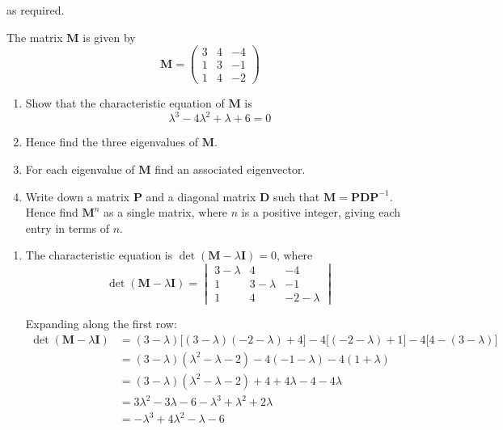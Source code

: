 \documentclass[leqno]{article}
\begin{document}
\begin{enumerate}[
  label=\textbf{\arabic*.},
  leftmargin=*,
  topsep=0pt,
  partopsep=0pt,
  parsep=0pt
]
\begin{djsSolution}
\begin{enumerate}[label=\textbf{(\alph*)}, start=1]
as required.
\end{enumerate}
\end{djsSolution}

\newpage

\questionitem

The matrix $\mathbf{M}$ is given by
\[\mathbf{M} = \begin{pmatrix} 3 & 4 & -4 \\ 1 & 3 & -1 \\ 1 & 4 & -2 \end{pmatrix}\]
\begin{enumerate}[label=\textbf{(\alph*)}]
  \item Show that the characteristic equation of $\mathbf{M}$ is
  \[\lambda^3 - 4\lambda^2 + \lambda + 6 = 0\] 
  \item Hence find the three eigenvalues of $\mathbf{M}$.  \\
  \item For each eigenvalue of $\mathbf{M}$ find an associated eigenvector.  \\
  \item Write down a matrix $\mathbf{P}$ and a diagonal matrix $\mathbf{D}$ such that $\mathbf{M} = \mathbf{P}\mathbf{D}\mathbf{P}^{-1}$. Hence find $\mathbf{M}^n$ as a single matrix, where $n$ is a positive integer, giving each entry in terms of $n$.  \\
\end{enumerate}

\vspace*{10pt}

\begin{djsSolution}
\begin{enumerate}[label=\textbf{(\alph*)}, start=1]
  \item The characteristic equation is \(\det(\mathbf{M}-\lambda\mathbf{I})=0\), where
\[
\det(\mathbf{M}-\lambda\mathbf{I})=\begin{vmatrix} 3-\lambda & 4 & -4 \\ 1 & 3-\lambda & -1 \\ 1 & 4 & -2-\lambda \end{vmatrix}
\]

Expanding along the first row:
\begin{align*}
\det(\mathbf{M}-\lambda\mathbf{I}) &= (3-\lambda)\big[(3-\lambda)(-2-\lambda)+4\big]-4\big[(-2-\lambda)+1\big]-4\big[4-(3-\lambda)\big]\\
&= (3-\lambda)(\lambda^2-\lambda-2)-4(-1-\lambda)-4(1+\lambda)\\
&= (3-\lambda)(\lambda^2-\lambda-2)+4+4\lambda-4-4\lambda\\
&= 3\lambda^2-3\lambda-6-\lambda^3+\lambda^2+2\lambda\\
&= -\lambda^3+4\lambda^2-\lambda-6
\end{align*}


\end{enumerate}
\end{djsSolution}
\end{enumerate}
\end{document}
